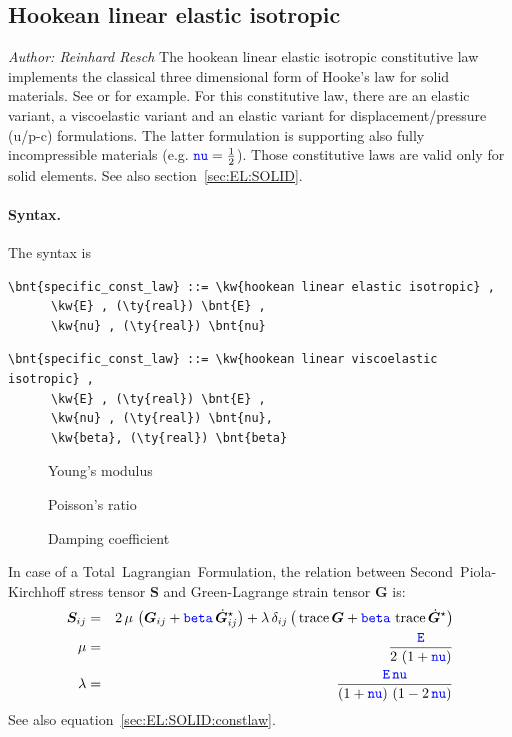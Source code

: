 \subsection{Hookean linear elastic isotropic}
\label{sec:CL:hookean:linear:elastic:isotropic}
\emph{Author: Reinhard Resch} The hookean linear elastic isotropic constitutive law implements the classical
three dimensional form of Hooke's law for solid materials.
See \cite{BATHE2016} or \cite{WALLRAPP1998} for example.
For this constitutive law, there are an elastic variant, a viscoelastic variant
and an elastic variant for displacement/pressure (u/p-c) formulations.
The latter formulation is supporting also fully incompressible materials (e.g. $\textcolor{blue}{\texttt{nu}} = \frac{1}{2}$).
Those constitutive laws are valid only for solid elements. See also section~\ref{sec:EL:SOLID}.

\paragraph{Syntax.}
The syntax is
\begin{Verbatim}[commandchars=\\\{\}]
    \bnt{specific_const_law} ::= \kw{hookean linear elastic isotropic} ,
      \kw{E} , (\ty{real}) \bnt{E} ,
      \kw{nu} , (\ty{real}) \bnt{nu}
\end{Verbatim}

\begin{Verbatim}[commandchars=\\\{\}]
    \bnt{specific_const_law} ::= \kw{hookean linear viscoelastic isotropic} ,
      \kw{E} , (\ty{real}) \bnt{E} ,
      \kw{nu} , (\ty{real}) \bnt{nu},
      \kw{beta}, (\ty{real}) \bnt{beta}
\end{Verbatim}

\begin{description}
\item[] Young's modulus
\item[] Poisson's ratio
\item[] Damping coefficient
\end{description}
In case of a Total~Lagrangian~Formulation, the relation between Second~Piola-Kirchhoff stress tensor $\boldsymbol{S}$
and Green-Lagrange strain tensor $\boldsymbol{G}$ is:
\begin{eqnarray}
  \boldsymbol{S}_{ij} & = & 2 \, \mu \, \left(\boldsymbol{G}_{ij} + \textcolor{blue}{\texttt{beta}} \, \dot{\boldsymbol{G}}_{ij}^{\star} \right) + \lambda \, \delta_{ij} \left( \, \operatorname{trace}{\boldsymbol{G}} + \textcolor{blue}{\texttt{beta}} \, \operatorname{trace}{\dot{\boldsymbol{G}}^{\star}}\right) \label{SEC:CL:hookean:sigma} \\
  \mu & = & \frac{\textcolor{blue}{\texttt{E}}}{2 \, \left(1 + \textcolor{blue}{\texttt{nu}}\right)} \\
  \lambda & = & \frac{\textcolor{blue}{\texttt{E}} \, \textcolor{blue}{\texttt{nu}}}{\left(1 + \textcolor{blue}{\texttt{nu}}\right) \, \left(1 - 2 \, \textcolor{blue}{\texttt{nu}} \right)}
\end{eqnarray}
See also equation~\ref{sec:EL:SOLID:constlaw}.

